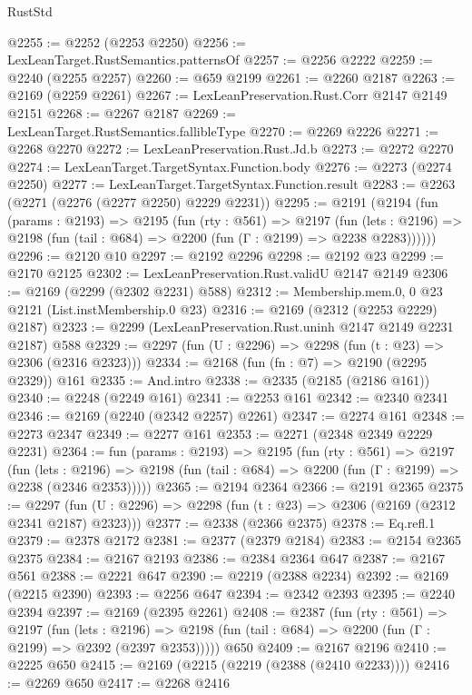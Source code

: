 \begin{lexlean}{RustStd}
\begin{coremodule}
@2255 := @2252 (@2253 @2250)
@2256 := LexLeanTarget.RustSemantics.patternsOf
@2257 := @2256 @2222
@2259 := @2240 (@2255 @2257)
@2260 := @659 @2199
@2261 := @2260 @2187
@2263 := @2169 (@2259 @2261)
@2267 := LexLeanPreservation.Rust.Corr @2147 @2149 @2151
@2268 := @2267 @2187
@2269 := LexLeanTarget.RustSemantics.fallibleType
@2270 := @2269 @2226
@2271 := @2268 @2270
@2272 := LexLeanPreservation.Rust.Jd.b
@2273 := @2272 @2270
@2274 := LexLeanTarget.TargetSyntax.Function.body
@2276 := @2273 (@2274 @2250)
@2277 := LexLeanTarget.TargetSyntax.Function.result
@2283 := @2263 (@2271 (@2276 (@2277 @2250) @2229 @2231))
@2295 := @2191
    (@2194
      (fun (params : @2193) =>
      @2195
        (fun (rty : @561) =>
        @2197
          (fun (lets : @2196) =>
          @2198 (fun (tail : @684) => @2200 (fun (Γ : @2199) => @2238 @2283))))))
@2296 := @2120 @10
@2297 := @2192 @2296
@2298 := @2192 @23
@2299 := @2170 @2125
@2302 := LexLeanPreservation.Rust.validU @2147 @2149
@2306 := @2169 (@2299 (@2302 @2231) @588)
@2312 := Membership.mem.{0, 0} @23 @2121 (List.instMembership.{0} @23)
@2316 := @2169 (@2312 (@2253 @2229) @2187)
@2323 := @2299 (LexLeanPreservation.Rust.uninh @2147 @2149 @2231 @2187) @588
@2329 := @2297 (fun (U : @2296) => @2298 (fun (t : @23) => @2306 (@2316 @2323)))
@2334 := @2168 (fun (fn : @7) => @2190 (@2295 @2329)) @161
@2335 := And.intro
@2338 := @2335 (@2185 (@2186 @161))
@2340 := @2248 (@2249 @161)
@2341 := @2253 @161
@2342 := @2340 @2341
@2346 := @2169 (@2240 (@2342 @2257) @2261)
@2347 := @2274 @161
@2348 := @2273 @2347
@2349 := @2277 @161
@2353 := @2271 (@2348 @2349 @2229 @2231)
@2364 := fun (params : @2193) =>
  @2195
    (fun (rty : @561) =>
    @2197
      (fun (lets : @2196) =>
      @2198 (fun (tail : @684) => @2200 (fun (Γ : @2199) => @2238 (@2346 @2353)))))
@2365 := @2194 @2364
@2366 := @2191 @2365
@2375 := @2297 (fun (U : @2296) => @2298 (fun (t : @23) => @2306 (@2169 (@2312 @2341 @2187) @2323)))
@2377 := @2338 (@2366 @2375)
@2378 := Eq.refl.{1}
@2379 := @2378 @2172
@2381 := @2377 (@2379 @2184)
@2383 := @2154 @2365 @2375
@2384 := @2167 @2193
@2386 := @2384 @2364 @647
@2387 := @2167 @561
@2388 := @2221 @647
@2390 := @2219 (@2388 @2234)
@2392 := @2169 (@2215 @2390)
@2393 := @2256 @647
@2394 := @2342 @2393
@2395 := @2240 @2394
@2397 := @2169 (@2395 @2261)
@2408 := @2387
    (fun (rty : @561) =>
    @2197
      (fun (lets : @2196) =>
      @2198 (fun (tail : @684) => @2200 (fun (Γ : @2199) => @2392 (@2397 @2353)))))
    @650
@2409 := @2167 @2196
@2410 := @2225 @650
@2415 := @2169 (@2215 (@2219 (@2388 (@2410 @2233))))
@2416 := @2269 @650
@2417 := @2268 @2416

\end{coremodule}
\end{lexlean}
